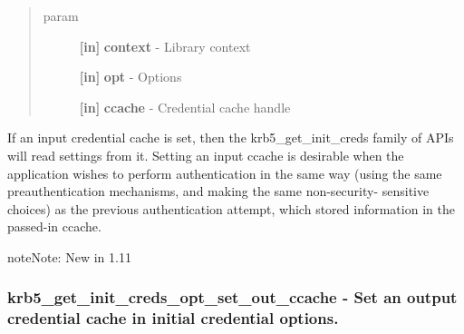\documentclass[letterpaper,10pt,english]{sphinxmanual}
\begin{document}
\begin{quote}\begin{description}
\item[{param}] \leavevmode
\textbf{{[}in{]}} \textbf{context} - Library context

\textbf{{[}in{]}} \textbf{opt} - Options

\textbf{{[}in{]}} \textbf{ccache} - Credential cache handle

\end{description}\end{quote}

If an input credential cache is set, then the krb5\_get\_init\_creds family of APIs will read settings from it. Setting an input ccache is desirable when the application wishes to perform authentication in the same way (using the same preauthentication mechanisms, and making the same non-security- sensitive choices) as the previous authentication attempt, which stored information in the passed-in ccache.

\begin{notice}{note}{Note:}
New in 1.11
\end{notice}


\subsubsection{krb5\_get\_init\_creds\_opt\_set\_out\_ccache -  Set an output credential cache in initial credential options.}
\label{appdev/refs/api/krb5_get_init_creds_opt_set_out_ccache:krb5-get-init-creds-opt-set-out-ccache-set-an-output-credential-cache-in-initial-credential-options}\label{appdev/refs/api/krb5_get_init_creds_opt_set_out_ccache::doc}

\begin{fulllineitems}
\label{appdev/refs/api/krb5_get_init_creds_opt_set_out_ccache:c.krb5_get_init_creds_opt_set_out_ccache}
\end{fulllineitems}
\end{document}
